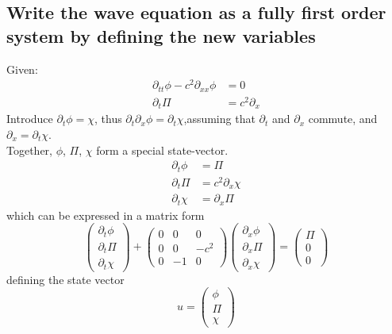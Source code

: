 \documentclass{article}
\begin{document}
\subsection{Write the wave equation as a fully first order system by defining the new variables}
Given: \\
\begin{equation}
	\begin{aligned}
	\partial_{tt}\phi - c^2\partial_{xx}\phi &= 0 \\
	\partial_t\Pi &= c^2 \partial_x
	\end{aligned}
\end{equation}
Introduce $\partial_t\phi=\chi$, thus $\partial_t\partial_x\phi=\partial_t\chi$,assuming that $\partial_t$ and $\partial_x$ commute, and $\partial_x = \partial_t\chi$. \\
Together, $\phi$, $\Pi$, $\chi$ form a special state-vector. 
\begin{equation}
	\label{eq:waveq:vectorstate}
	\begin{aligned}
	\partial_t\phi &= \Pi \\
	\partial_t\Pi &= c^2\partial_x\chi \\
	\partial_t\chi &= \partial_x\Pi
	\end{aligned}
\end{equation}
which can be expressed in a matrix form
\begin{equation}
	\begin{pmatrix}
	\partial_t\phi \\
	\partial_t\Pi \\
	\partial_t\chi
	\end{pmatrix} 
	+ 
	\begin{pmatrix}
	0 & 0 & 0 \\
	0 & 0 & -c^2 \\
	0 & -1 & 0 
	\end{pmatrix}
	\begin{pmatrix}
	\partial_x\phi \\
	\partial_x\Pi \\
	\partial_x\chi
	\end{pmatrix}
	=
	\begin{pmatrix}
	\Pi \\
	0 \\
	0
	\end{pmatrix}
\end{equation}
defining the state vector
\begin{equation}
	u = 
	\begin{pmatrix}
	\phi \\ 
	\Pi \\
	\chi
	\end{pmatrix}
\end{equation}
\end{document}
